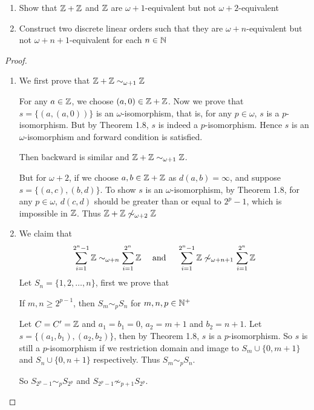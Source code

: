 \documentclass[11pt]{article}
\begin{document}
\begin{exercise}
\begin{enumerate}
\item Show that \(\mathbb{Z}+\mathbb{Z}\) and \(\mathbb{Z}\) are \(\omega+1\)-equivalent but not \(\omega+2\)-equivalent
\item Construct two discrete linear orders such that they are \(\omega+n\)-equivalent but
not \(\omega+n+1\)-equivalent for each \(n\in\mathbb{N}\)
\end{enumerate}
\end{exercise}

\begin{proof}
\begin{enumerate}
\item We first prove that \(\mathbb{Z}+\mathbb{Z}\sim_{\omega+1}\mathbb{Z}\)

 For any \(a\in\mathbb{Z}\), we choose \((a,0)\in\mathbb{Z}+\mathbb{Z}\). Now we prove that \(s=\{(a,(a,0))\}\) is an
\(\omega\)-isomorphism, that is, for any \(p\in\omega\), \(s\) is a \(p\)-isomorphism. But by Theorem 1.8, \(s\)
is indeed a \(p\)-isomorphism. Hence \(s\) is an \(\omega\)-isomorphism and forward condition is
satisfied.

Then backward is similar and \(\mathbb{Z}+\mathbb{Z}\sim_{\omega+1}\mathbb{Z}\).

But for \(\omega+2\), if we choose \(a,b\in\mathbb{Z}+\mathbb{Z}\) as \(d(a,b)=\infty\), and suppose \(s=\{(a,c),(b,d)\}\). To
show \(s\) is an \(\omega\)-isomorphism, by
Theorem 1.8, for any \(p\in\omega\), \(d(c,d)\) should be greater than or equal to \(2^p-1\), which is
impossible in \(\mathbb{Z}\). Thus \(\mathbb{Z}+\mathbb{Z}\not\sim_{\omega+2}\mathbb{Z}\)

\item We claim that
\begin{equation*}
\sum_{i=1}^{2^n-1}\mathbb{Z}\sim_{\omega+n}\sum_{i=1}^{2^n}\mathbb{Z} \quad\text{ and }\quad
\sum_{i=1}^{2^n-1}\mathbb{Z}\not\sim_{\omega+n+1}\sum_{i=1}^{2^n}\mathbb{Z}
\end{equation*}
Let \(S_n=\{1,2,\dots,n\}\), first we prove that
\begin{quoting}
If \(m,n\ge 2^{p-1}\), then \(S_m\sim_pS_n\) for \(m,n,p\in\mathbb{N}^+\)
\end{quoting}
Let \(C=C'=\mathbb{Z}\) and \(a_1=b_1=0\), \(a_2=m+1\) and \(b_2=n+1\).
Let \(s =\{(a_1,b_1),(a_2,b_2)\}\), then by Theorem 1.8, \(s\) is a \(p\)-isomorphism. So \(s\) is
still a \(p\)-isomorphism if we restriction domain and image to \(S_m\cup\{0,m+1\}\)
and \(S_n\cup\{0,n+1\}\) respectively. Thus \(S_m\sim_pS_n\).

So \(S_{2^p-1}\sim_pS_{2^p}\) and \(S_{2^p-1}\not\sim_{p+1}S_{2^p}\).


\end{enumerate}
\end{proof}
\end{document}
